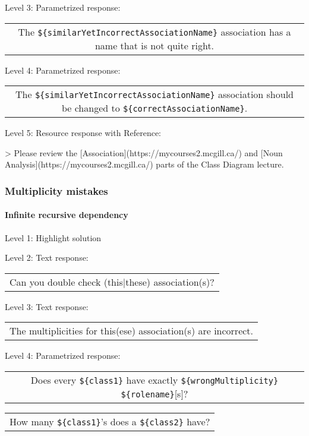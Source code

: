 \noindent Level 3: Parametrized response: \medskip

\begin{tabular}{|c}
The \verb|${similarYetIncorrectAssociationName}| association has a name that is not quite right.
\end{tabular} \medskip

\noindent Level 4: Parametrized response: \medskip

\begin{tabular}{|c}
The \verb|${similarYetIncorrectAssociationName}| association should be changed to \verb|${correctAssociationName}|.
\end{tabular} \medskip

\noindent Level 5: Resource response with Reference:

> Please review the [Association](https://mycourses2.mcgill.ca/) and [Noun Analysis](https://mycourses2.mcgill.ca/) parts of the Class Diagram lecture.


\subsubsection{Multiplicity mistakes}

\paragraph{Infinite recursive dependency}

\noindent Level 1: Highlight solution \medskip

\noindent Level 2: Text response: \medskip

\begin{tabular}{|c}
Can you double check (this|these) association(s)?
\end{tabular} \medskip

\noindent Level 3: Text response: \medskip

\begin{tabular}{|c}
The multiplicities for this(ese) association(s) are incorrect.
\end{tabular} \medskip

\noindent Level 4: Parametrized response: \medskip

\begin{tabular}{|c}
Does every \verb|${class1}| have exactly \verb|${wrongMultiplicity}| \verb|${rolename}|[s]?
\end{tabular} \medskip

\begin{tabular}{|c}
How many \verb|${class1}|'s does a \verb|${class2}| have?
\end{tabular} \medskip

